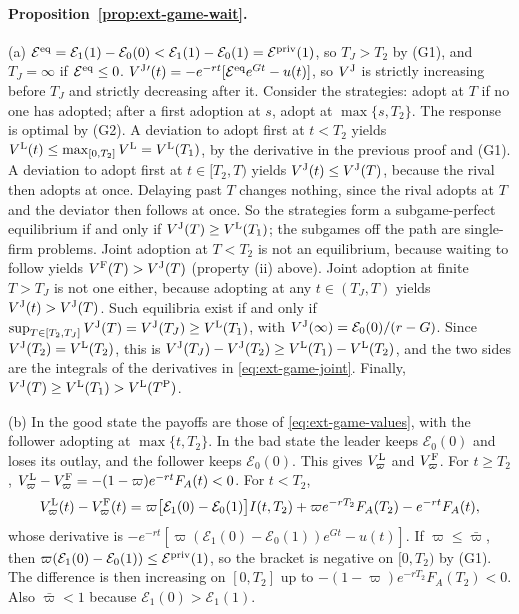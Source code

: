 \paragraph{Proposition~\ref{prop:ext-game-wait}.} (a) $\mathcal E^{\rm eq}=\mathcal E_1(1)-\mathcal E_0(0)<\mathcal E_1(1)-\mathcal E_0(1)=\mathcal E^{\rm priv}(1)$, so $T_J>T_2$ by (G1), and $T_J=\infty$ if $\mathcal E^{\rm eq}\le0$. $V^{\rm J}{}'(t)=-e^{-rt}[\mathcal E^{\rm eq}e^{Gt}-u(t)]$, so $V^{\rm J}$ is strictly increasing before $T_J$ and strictly decreasing after it. Consider the strategies: adopt at $T$ if no one has adopted; after a first adoption at $s$, adopt at $\max\{s,T_2\}$. The response is optimal by (G2). A deviation to adopt first at $t<T_2$ yields $V^{\rm L}(t)\le\max_{[0,T_2]}V^{\rm L}=V^{\rm L}(T_1)$, by the derivative in the previous proof and (G1). A deviation to adopt first at $t\in[T_2,T)$ yields $V^{\rm J}(t)\le V^{\rm J}(T)$, because the rival then adopts at once. Delaying past $T$ changes nothing, since the rival adopts at $T$ and the deviator then follows at once. So the strategies form a subgame-perfect equilibrium if and only if $V^{\rm J}(T)\ge V^{\rm L}(T_1)$; the subgames off the path are single-firm problems. Joint adoption at $T<T_2$ is not an equilibrium, because waiting to follow yields $V^{\rm F}(T)>V^{\rm J}(T)$ (property (ii) above). Joint adoption at finite $T>T_J$ is not one either, because adopting at any $t\in(T_J,T)$ yields $V^{\rm J}(t)>V^{\rm J}(T)$. Such equilibria exist if and only if $\sup_{T\in[T_2,T_J]}V^{\rm J}(T)=V^{\rm J}(T_J)\ge V^{\rm L}(T_1)$, with $V^{\rm J}(\infty)=\mathcal E_0(0)/(r-G)$. Since $V^{\rm J}(T_2)=V^{\rm L}(T_2)$, this is $V^{\rm J}(T_J)-V^{\rm J}(T_2)\ge V^{\rm L}(T_1)-V^{\rm L}(T_2)$, and the two sides are the integrals of the derivatives in \eqref{eq:ext-game-joint}. Finally, $V^{\rm J}(T)\ge V^{\rm L}(T_1)>V^{\rm L}(T^{\rm P})$.

(b) In the good state the payoffs are those of \eqref{eq:ext-game-values}, with the follower adopting at $\max\{t,T_2\}$. In the bad state the leader keeps $\mathcal E_0(0)$ and loses its outlay, and the follower keeps $\mathcal E_0(0)$. This gives $V^{\rm L}_\varpi$ and $V^{\rm F}_\varpi$. For $t\ge T_2$, $V^{\rm L}_\varpi-V^{\rm F}_\varpi=-(1-\varpi)e^{-rt}F_A(t)<0$. For $t<T_2$,
\[
V^{\rm L}_\varpi(t)-V^{\rm F}_\varpi(t)=\varpi\bigl[\mathcal E_1(0)-\mathcal E_0(1)\bigr]I(t,T_2)+\varpi e^{-rT_2}F_A(T_2)-e^{-rt}F_A(t),
\]
whose derivative is $-e^{-rt}[\varpi(\mathcal E_1(0)-\mathcal E_0(1))e^{Gt}-u(t)]$. If $\varpi\le\bar\varpi$, then $\varpi(\mathcal E_1(0)-\mathcal E_0(1))\le\mathcal E^{\rm priv}(1)$, so the bracket is negative on $[0,T_2)$ by (G1). The difference is then increasing on $[0,T_2]$ up to $-(1-\varpi)e^{-rT_2}F_A(T_2)<0$. Also $\bar\varpi<1$ because $\mathcal E_1(0)>\mathcal E_1(1)$.

